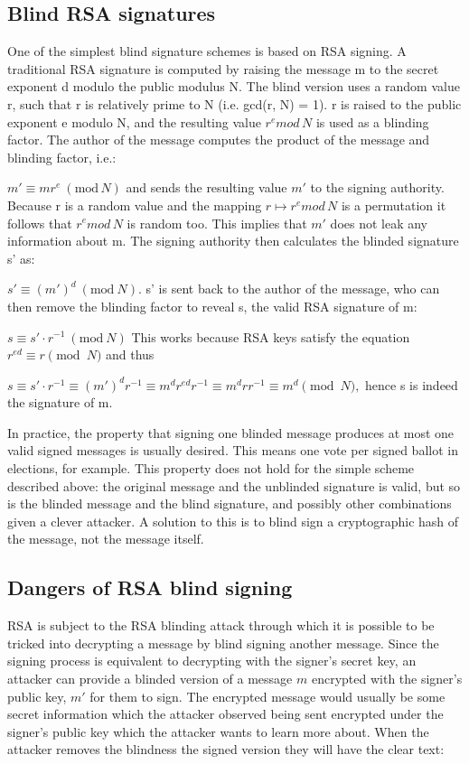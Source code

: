 \documentclass{article}
\begin{document}
\subsection{Blind RSA signatures}
One of the simplest blind signature schemes is based on RSA signing. A traditional RSA signature is computed by raising the message m to the secret exponent d modulo the public modulus N. The blind version uses a random value r, such that r is relatively prime to N (i.e. gcd(r, N) = 1). r is raised to the public exponent e modulo N, and the resulting value ${ r^{e} {mod\, {N}}}$ is used as a blinding factor. The author of the message computes the product of the message and blinding factor, i.e.:

${ m'\equiv mr^{e}\ (\mathrm {mod} \, N)}$
and sends the resulting value ${ m'}$ to the signing authority. Because r is a random value and the mapping ${ r\mapsto r^{e}{ mod\, {N}}}$ is a permutation it follows that ${ r^{e}{ mod\, {N}}}$ is random too. This implies that ${ m'}$ does not leak any information about m. The signing authority then calculates the blinded signature s' as:

${ s'\equiv (m')^{d}\ (\mathrm {mod} \ N).}$
s' is sent back to the author of the message, who can then remove the blinding factor to reveal s, the valid RSA signature of m:

${ s\equiv s'\cdot r^{-1}\ (\mathrm {mod} \ N)}$
This works because RSA keys satisfy the equation ${ r^{ed}\equiv r{\pmod {N}}}$ and thus

${ s\equiv s'\cdot r^{-1}\equiv (m')^{d}r^{-1}\equiv m^{d}r^{ed}r^{-1}\equiv m^{d}rr^{-1}\equiv m^{d}{\pmod {N}},}$
hence s is indeed the signature of m.

In practice, the property that signing one blinded message produces at most one valid signed messages is usually desired. This means one vote per signed ballot in elections, for example. This property does not hold for the simple scheme described above: the original message and the unblinded signature is valid, but so is the blinded message and the blind signature, and possibly other combinations given a clever attacker. A solution to this is to blind sign a cryptographic hash of the message, not the message itself.

\subsection{Dangers of RSA blind signing}
RSA is subject to the RSA blinding attack through which it is possible to be tricked into decrypting a message by blind signing another message. Since the signing process is equivalent to decrypting with the signer's secret key, an attacker can provide a blinded version of a message ${ m}$ encrypted with the signer's public key, ${ m'}$ for them to sign. The encrypted message would usually be some secret information which the attacker observed being sent encrypted under the signer's public key which the attacker wants to learn more about. When the attacker removes the blindness the signed version they will have the clear text:
\end{document}
